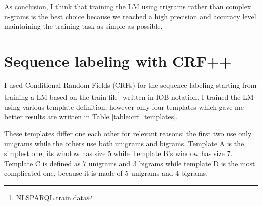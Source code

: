 \documentclass[a4paper,7pt,oneside]{book}
\begin{document}
\noindent
As conclusion, I think that training the LM using trigrams rather than complex n-grams is the best choice because we reached a high precision and accuracy level maintaining the training task as simple as possible.

\chapter{Sequence labeling with CRF++}

I used Conditional Random Fields (CRFs) for the sequence labeling starting from training a LM based on the train file\footnote{NLSPARQL.train.data} written in IOB notation. I trained the LM using various template definition, however only four templates which gave me better results are written in Table \ref{table:crf_templates}.

\noindent
These templates differ one each other for relevant reasons: the first two use only unigrams while the others use both unigrams and bigrams. Template A is the simplest one, its window has size 5 while Template B's window has size 7. Template C is defined as 7 unigrams and 3 bigrams while template D is the most complicated one, because it is made of 5 unigrams and 4 bigrams.
\end{document}
